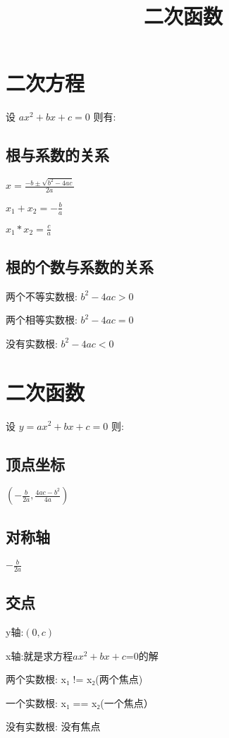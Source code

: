 \documentclass[fleqn]{ctexart}
\title{二次函数}
\begin{document}
\maketitle

\section{二次方程}
设 $ax^2+bx+c=0$ 则有:
\subsection{根与系数的关系}
$x = \frac{-b\pm\sqrt{b^2-4ac}}{2a}$ 

$x_1+x_2 = -\frac{b}{a}$ 

$x_1*x_2 = \frac{c}{a}$ 

\subsection{根的个数与系数的关系}
两个不等实数根: $b^2-4ac > 0$ 

两个相等实数根: $b^2-4ac = 0$ 

没有实数根: $b^2-4ac < 0$ 

\section{二次函数}
设 $y = ax^2+bx+c=0$ 则:
\subsection{顶点坐标}
$(-\frac{b}{2a},\frac{4ac-b^2}{4a})$
\subsection{对称轴}
$-\frac{b}{2a}$
\subsection{交点}
y轴:$(0,c)$ 

x轴:就是求方程$ax^2+bx+c$=0的解 

两个实数根: x₁ != x₂(两个焦点) 

一个实数根: x₁ == x₂(一个焦点）

没有实数根: 没有焦点 
\end{document}
